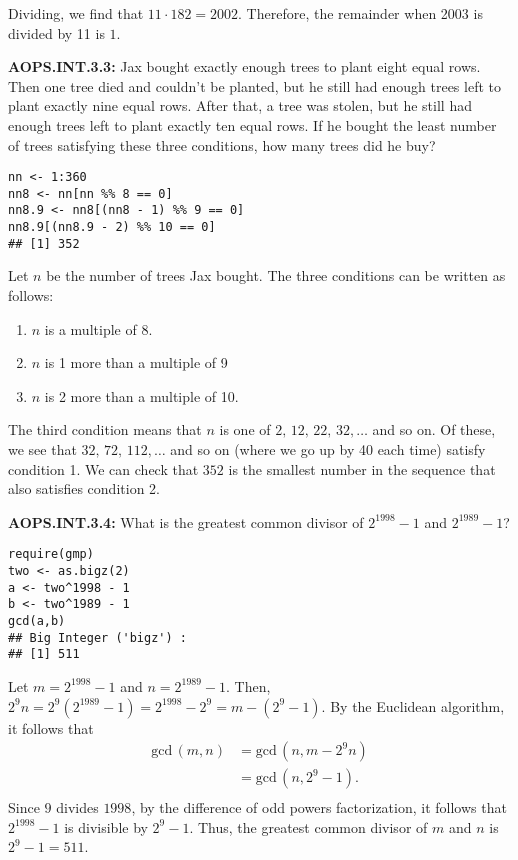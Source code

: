 \documentclass[11pt]{article}
\newenvironment{uzdevums}[1][\unskip]{%
\vspace{3mm}
\noindent
\textbf{#1:}
\noindent}
{}
\begin{document}
Dividing, we find that $11\cdot 182=2002$. Therefore, the remainder when 2003 is divided by 11 is $\boxed{1}$.


\begin{uzdevums}[AOPS.INT.3.3]
Jax bought exactly enough trees to plant eight equal rows. Then one tree died and couldn't be planted, but he still had enough trees left to plant exactly nine equal rows. After that, a tree was stolen, but he still had enough trees left to plant exactly ten equal rows. If he bought the least number of trees satisfying these three conditions, how many trees did he buy?
\end{uzdevums}

\begin{verbatim}
nn <- 1:360
nn8 <- nn[nn %% 8 == 0]
nn8.9 <- nn8[(nn8 - 1) %% 9 == 0]
nn8.9[(nn8.9 - 2) %% 10 == 0]
## [1] 352
\end{verbatim}


Let $n$ be the number of trees Jax bought. The three conditions can be written as follows:
\begin{enumerate}
\item $n$ is a multiple of 8.
\item $n$ is 1 more than a multiple of 9
\item $n$ is 2 more than a multiple of 10.
\end{enumerate}

The third condition means that $n$ is one of $2,\, 12,\, 22,\, 32,\ldots$ and so on. Of these, we see that $32,\, 72,\, 112,\ldots$ and so on (where we go up by 40 each time) satisfy condition 1. We can check that $\boxed{352}$ is the smallest number in the sequence that also satisfies condition 2.



\begin{uzdevums}[AOPS.INT.3.4]
What is the greatest common divisor of $2^{1998}-1$ and $2^{1989}-1$?
\end{uzdevums}


\begin{verbatim}
require(gmp)
two <- as.bigz(2)
a <- two^1998 - 1
b <- two^1989 - 1
gcd(a,b)
## Big Integer ('bigz') :
## [1] 511
\end{verbatim}

Let $m = 2^{1998} - 1$ and $n = 2^{1989}-1$. Then, $2^9n = 2^9(2^{1989}-1) = 2^{1998} - 2^9 = m - (2^9 - 1)$. By the Euclidean algorithm, it follows that \begin{align*}
\text{gcd}\,(m,n) &= \text{gcd}\,(n,m-2^9n) \\
&= \text{gcd}\,(n,2^9-1). \\
\end{align*}Since $9$ divides $1998$, by the difference of odd powers factorization, it follows that $2^{1998}-1$ is divisible by $2^9 - 1$. Thus, the greatest common divisor of $m$ and $n$ is $2^9 - 1 = \boxed{511}$.
\end{document}

